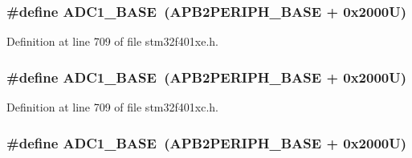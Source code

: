 \subsubsection[{\texorpdfstring{A\+D\+C1\+\_\+\+B\+A\+SE}{ADC1_BASE}}]{\setlength{\rightskip}{0pt plus 5cm}\#define A\+D\+C1\+\_\+\+B\+A\+SE~({\bf A\+P\+B2\+P\+E\+R\+I\+P\+H\+\_\+\+B\+A\+SE} + 0x2000\+U)}\hypertarget{group___peripheral__registers__structures_ga695c9a2f892363a1c942405c8d351b91}{}\label{group___peripheral__registers__structures_ga695c9a2f892363a1c942405c8d351b91}


Definition at line 709 of file stm32f401xe.\+h.

\subsubsection[{\texorpdfstring{A\+D\+C1\+\_\+\+B\+A\+SE}{ADC1_BASE}}]{\setlength{\rightskip}{0pt plus 5cm}\#define A\+D\+C1\+\_\+\+B\+A\+SE~({\bf A\+P\+B2\+P\+E\+R\+I\+P\+H\+\_\+\+B\+A\+SE} + 0x2000\+U)}\hypertarget{group___peripheral__registers__structures_ga695c9a2f892363a1c942405c8d351b91}{}\label{group___peripheral__registers__structures_ga695c9a2f892363a1c942405c8d351b91}


Definition at line 709 of file stm32f401xc.\+h.

\subsubsection[{\texorpdfstring{A\+D\+C1\+\_\+\+B\+A\+SE}{ADC1_BASE}}]{\setlength{\rightskip}{0pt plus 5cm}\#define A\+D\+C1\+\_\+\+B\+A\+SE~({\bf A\+P\+B2\+P\+E\+R\+I\+P\+H\+\_\+\+B\+A\+SE} + 0x2000\+U)}\hypertarget{group___peripheral__registers__structures_ga695c9a2f892363a1c942405c8d351b91}{}\label{group___peripheral__registers__structures_ga695c9a2f892363a1c942405c8d351b91}


